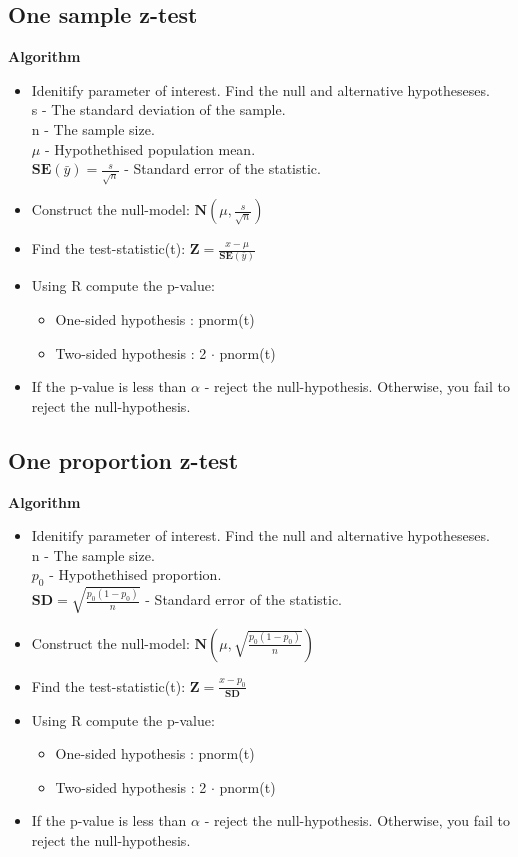 \documentclass{article}
\begin{document}
\subsection{One sample z-test}
\textbf{Algorithm}
\begin{itemize}
\item Idenitify parameter of interest. Find the null and alternative hypotheseses.\\
      s - The standard deviation of the sample.\\
      n - The sample size.\\
      $\mu$ - Hypothethised population mean.\\
      $\mathbf{SE}(\bar{y}) = \frac{s}{\sqrt{n}}$ - Standard error of the statistic.
\item Construct the null-model: $\mathbf{N}(\mu,\frac{s}{\sqrt{n}})$
\item Find the test-statistic(t): $\mathbf{Z} = \frac{x-\mu}{\mathbf{SE}(\bar{y})}$
\item Using R compute the p-value:
\begin{itemize}
    \item One-sided hypothesis : pnorm(t)
    \item Two-sided hypothesis : 2 $\cdot$ pnorm(t)
\end{itemize}
\item If the p-value is less than $\alpha$ - reject the null-hypothesis. 
    Otherwise, you fail to reject the null-hypothesis.
\end{itemize}
\subsection{One proportion z-test}
\textbf{Algorithm}
\begin{itemize}
\item Idenitify parameter of interest. Find the null and alternative hypotheseses.\\
      n - The sample size.\\
      $p_0$ - Hypothethised proportion.\\
      $\mathbf{SD} = \sqrt{\frac{p_0(1-p_0)}{n}}$ - Standard error of the statistic.
\item Construct the null-model: $\mathbf{N}(\mu,\sqrt{\frac{p_0(1-p_0)}{n}})$
\item Find the test-statistic(t): $\mathbf{Z} = \frac{x-p_0}{\mathbf{SD}}$
\item Using R compute the p-value:
\begin{itemize}
    \item One-sided hypothesis : pnorm(t)
    \item Two-sided hypothesis : 2 $\cdot$ pnorm(t)
\end{itemize}
\item If the p-value is less than $\alpha$ - reject the null-hypothesis. 
    Otherwise, you fail to reject the null-hypothesis.
\end{itemize}
\end{document}
